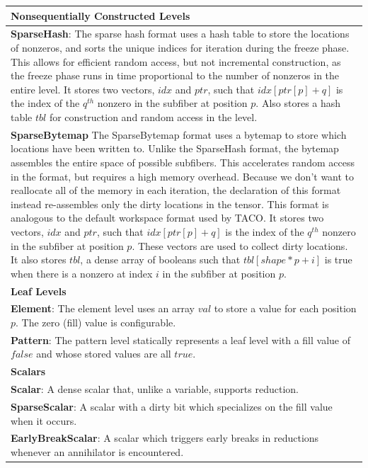 \begin{table}[h]
\begin{tabular}{p{14cm}}
    \hline
    \textbf{Nonsequentially Constructed Levels} \\
    \hline
    \textbf{SparseHash}:
    The sparse hash format uses a hash table to store the locations of nonzeros, and sorts the unique indices for iteration during the freeze phase.
    This allows for efficient random access, but not incremental construction, as the freeze phase runs in time proportional to the number of nonzeros in the entire level.
    It stores two vectors, $idx$ and $ptr$, such that $idx[ptr[p] + q]$ is the index of the $q^{th}$ nonzero in the subfiber at position $p$. 
    Also stores a hash table $tbl$ for construction and random access in the level. \\
    \textbf{SparseBytemap}
    The SparseBytemap format uses a bytemap to store which locations have been written to.
    Unlike the SparseHash format, the bytemap assembles the entire space of possible subfibers.
    This accelerates random access in the format, but requires a high memory overhead.
    Because we don't want to reallocate all of the memory in each iteration, the declaration of this format instead re-assembles only the dirty locations in the tensor.
    This format is analogous to the default workspace format used by TACO.
    It stores two vectors, $idx$ and $ptr$, such that $idx[ptr[p] + q]$ is the index of the $q^{th}$ nonzero in the subfiber at position $p$.
    These vectors are used to collect dirty locations.
    It also stores $tbl$, a dense array of booleans such that $tbl[shape * p + i]$ is true when there is a nonzero at index $i$ in the subfiber at position $p$. \\
    \hline
    \textbf{Leaf Levels} \\
    \hline
    \textbf{Element}:
    The element level uses an array $val$ to store a value for each position $p$. The zero (fill) value is configurable.\\
    \textbf{Pattern}:
    The pattern level statically represents a leaf level with a fill value of $false$ and whose stored values are all $true$. \\
    \hline
    \textbf{Scalars} \\
    \hline
    \textbf{Scalar}:
    A dense scalar that, unlike a variable, supports reduction.  \\
    \textbf{SparseScalar}:
    A scalar with a dirty bit which specializes on the fill value when it occurs.\\
    \textbf{EarlyBreakScalar}:
    A scalar which triggers early breaks in reductions whenever an annihilator is encountered.\\

\end{tabular}
\end{table}
